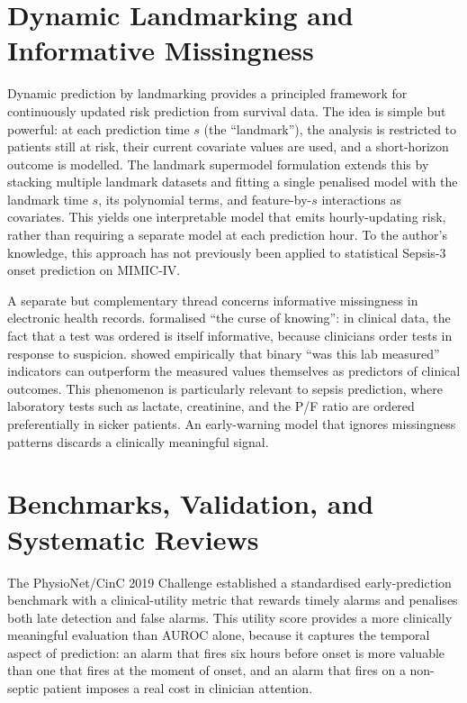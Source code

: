 \section{Dynamic Landmarking and Informative Missingness}
\label{sec:landmark_miss}

Dynamic prediction by landmarking \cite{vanhouwelingen2007landmark} provides
a principled framework for continuously updated risk prediction from survival
data. The idea is simple but powerful: at each prediction time $s$ (the
``landmark''), the analysis is restricted to patients still at risk, their
current covariate values are used, and a short-horizon outcome is modelled.
The landmark supermodel formulation \cite{fries2023dynamiclm} extends this by
stacking multiple landmark datasets and fitting a single penalised model with
the landmark time $s$, its polynomial terms, and feature-by-$s$ interactions as
covariates. This yields one interpretable model that emits hourly-updating risk,
rather than requiring a separate model at each prediction hour. To the
author's knowledge, this approach has not previously been applied to
statistical Sepsis-3 onset prediction on MIMIC-IV.

A separate but complementary thread concerns informative missingness in
electronic health records. \textcite{groenwold2020missingness} formalised
``the curse of knowing'': in clinical data, the fact that a test was ordered
is itself informative, because clinicians order tests in response to suspicion.
\textcite{singh2021missingness} showed empirically that binary
``was this lab measured'' indicators can outperform the measured values
themselves as predictors of clinical outcomes. This phenomenon is particularly
relevant to sepsis prediction, where laboratory tests such as lactate,
creatinine, and the P/F ratio are ordered preferentially in sicker patients.
An early-warning model that ignores missingness patterns discards a
clinically meaningful signal.

\section{Benchmarks, Validation, and Systematic Reviews}
\label{sec:benchmark}

The PhysioNet/CinC 2019 Challenge \cite{reyna2020physionet} established a
standardised early-prediction benchmark with a clinical-utility metric that
rewards timely alarms and penalises both late detection and false alarms. This
utility score provides a more clinically meaningful evaluation than AUROC alone,
because it captures the temporal aspect of prediction: an alarm that fires six
hours before onset is more valuable than one that fires at the moment of onset,
and an alarm that fires on a non-septic patient imposes a real cost in
clinician attention.

